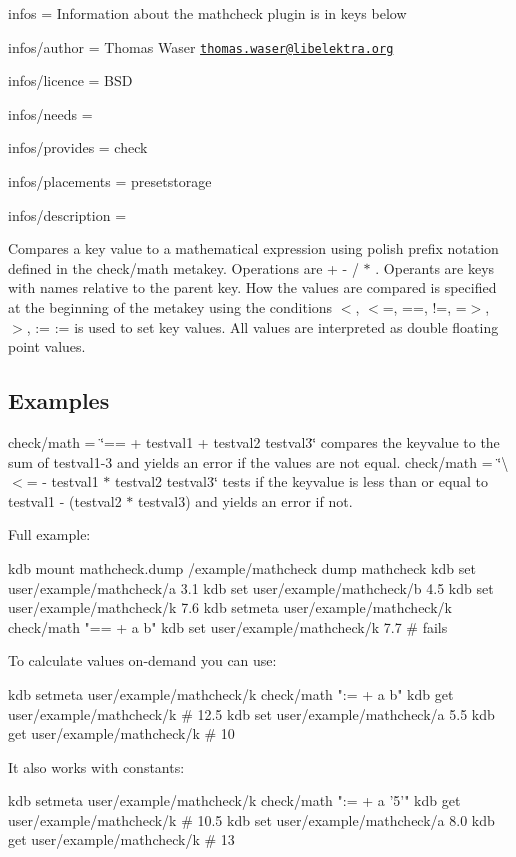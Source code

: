 
\begin{DoxyItemize}
\item infos = Information about the mathcheck plugin is in keys below
\item infos/author = Thomas Waser \href{mailto:thomas.waser@libelektra.org}{\tt thomas.\+waser@libelektra.\+org}
\item infos/licence = B\+S\+D
\item infos/needs =
\item infos/provides = check
\item infos/placements = presetstorage
\item infos/description =
\end{DoxyItemize}

Compares a key value to a mathematical expression using polish prefix notation defined in the {\ttfamily check/math} metakey. Operations are {\ttfamily + -\/ / $\ast$} . Operants are keys with names relative to the parent key. How the values are compared is specified at the beginning of the metakey using the conditions {\ttfamily $<$, $<$=, ==, !=, =$>$, $>$, \+:=} {\ttfamily \+:=} is used to set key values. All values are interpreted as {\ttfamily double} floating point values.

\subsection*{Examples}

{\ttfamily check/math = \char`\"{}== + testval1 + testval2 testval3\char`\"{}} compares the keyvalue to the sum of testval1-\/3 and yields an error if the values are not equal. {\ttfamily check/math = \char`\"{}\textbackslash{}$<$= -\/ testval1 $\ast$ testval2 testval3\char`\"{}} tests if the keyvalue is less than or equal to testval1 -\/ (testval2 $\ast$ testval3) and yields an error if not.

Full example\+: \begin{DoxyVerb}    kdb mount mathcheck.dump /example/mathcheck dump mathcheck
    kdb set user/example/mathcheck/a 3.1
    kdb set user/example/mathcheck/b 4.5
    kdb set user/example/mathcheck/k 7.6
    kdb setmeta user/example/mathcheck/k check/math "== + a b"
    kdb set user/example/mathcheck/k 7.7   # fails
\end{DoxyVerb}


To calculate values on-\/demand you can use\+: \begin{DoxyVerb}    kdb setmeta user/example/mathcheck/k check/math ":= + a b"
    kdb get user/example/mathcheck/k       # 12.5
    kdb set user/example/mathcheck/a 5.5
    kdb get user/example/mathcheck/k       # 10
\end{DoxyVerb}


It also works with constants\+: \begin{DoxyVerb}    kdb setmeta user/example/mathcheck/k check/math ":= + a '5'"
    kdb get user/example/mathcheck/k       # 10.5
    kdb set user/example/mathcheck/a 8.0
    kdb get user/example/mathcheck/k       # 13\end{DoxyVerb}
 